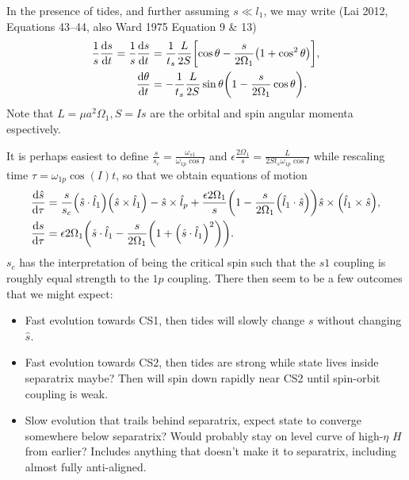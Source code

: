 \documentclass[11pt,
        usenames, %
        dvipsnames %
    ]{article}
\newcommand*{\rd}[2]{\frac{\mathrm{d}#1}{\mathrm{d}#2}}
\DeclarePairedDelimiter\p{\lparen}{\rparen}
\DeclarePairedDelimiter\s{\lbrack}{\rbrack}
\begin{document}
In the presence of tides, and further assuming $s \ll l_1$, we may write (Lai
2012, Equations 43--44, also Ward 1975 Equation 9 \& 13)
\begin{align}
    \frac{1}{s}\rd{s}{t}
        = \frac{1}{s}\rd{s}{t}
        &= \frac{1}{t_s}\frac{L}{2S}\s*{\cos\theta
            - \frac{s}{2\Omega_1}\p*{1 + \cos^2\theta}},\\
    \rd{\theta}{t} &= -\frac{1}{t_s}\frac{L}{2S}
        \sin\theta\p*{1 - \frac{s}{2\Omega_1}\cos\theta}.
\end{align}
Note that $L = \mu a^2\Omega_1, S = Is$ are the orbital and spin angular momenta
espectively.

It is perhaps easiest to define $\frac{s}{s_c} =
\frac{\omega_{s1}}{\omega_{1p}\cos I}$ and $\epsilon\frac{2\Omega_1}{s} =
\frac{L}{2St_s \omega_{1p}\cos I}$ while rescaling time $\tau =
\omega_{1p}\cos(I) t$, so that we obtain equations of motion
\begin{align}
    \rd{\hat{s}}{\tau}
        &= \frac{s}{s_c}\p*{\hat{s} \cdot \hat{l}_1}\p*{\hat{s} \times \hat{l}_1}
            - \hat{s} \times \hat{l}_p
            + \frac{\epsilon 2\Omega_1}{s}
                \p*{1 - \frac{s}{2\Omega_1}\p*{\hat{l}_1 \cdot \hat{s}}}
                    \hat{s} \times \p*{\hat{l}_1 \times \hat{s}},\\
    \rd{s}{\tau}
        &= \epsilon 2\Omega_1 \p*{\hat{s} \cdot \hat{l}_1 - \frac{s}{2\Omega_1}\p*{1
            + \p*{\hat{s} \cdot \hat{l}_1}^2}}.
\end{align}
$s_c$ has the interpretation of being the critical spin such that the $s1$
coupling is roughly equal strength to the $1p$ coupling. There then seem to be a
few outcomes that we might expect:
\begin{itemize}
    \item Fast evolution towards CS1, then tides will slowly change $s$ without
        changing $\hat{s}$.

    \item Fast evolution towards CS2, then tides are strong while state lives
        inside separatrix maybe? Then will spin down rapidly near CS2 until
        spin-orbit coupling is weak.

    \item Slow evolution that trails behind separatrix, expect state to converge
        somewhere below separatrix? Would probably stay on level curve of
        high-$\eta$ $H$ from earlier? Includes anything that doesn't make it to
        separatrix, including almost fully anti-aligned.
\end{itemize}
\end{document}
